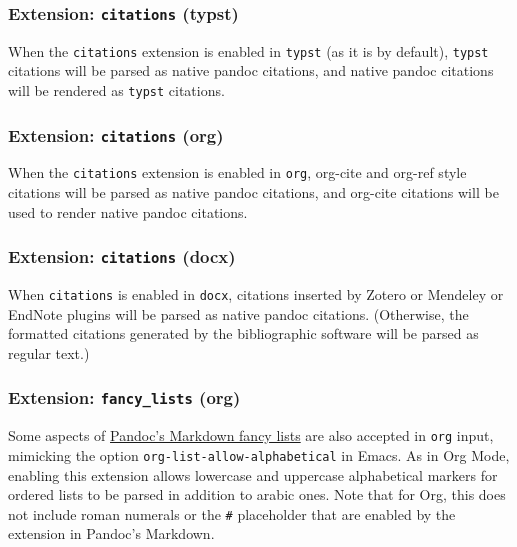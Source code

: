 \documentclass[
]{article}
\begin{document}
\hypertarget{typst-citations}{%
\subsubsection{\texorpdfstring{Extension: \texttt{citations}
(typst)}{Extension: citations (typst)}}\label{typst-citations}}

When the \texttt{citations} extension is enabled in \texttt{typst} (as
it is by default), \texttt{typst} citations will be parsed as native
pandoc citations, and native pandoc citations will be rendered as
\texttt{typst} citations.

\hypertarget{org-citations}{%
\subsubsection{\texorpdfstring{Extension: \texttt{citations}
(org)}{Extension: citations (org)}}\label{org-citations}}

When the \texttt{citations} extension is enabled in \texttt{org},
org-cite and org-ref style citations will be parsed as native pandoc
citations, and org-cite citations will be used to render native pandoc
citations.

\hypertarget{docx-citations}{%
\subsubsection{\texorpdfstring{Extension: \texttt{citations}
(docx)}{Extension: citations (docx)}}\label{docx-citations}}

When \texttt{citations} is enabled in \texttt{docx}, citations inserted
by Zotero or Mendeley or EndNote plugins will be parsed as native pandoc
citations. (Otherwise, the formatted citations generated by the
bibliographic software will be parsed as regular text.)

\hypertarget{org-fancy-lists}{%
\subsubsection{\texorpdfstring{Extension: \texttt{fancy\_lists}
(org)}{Extension: fancy\_lists (org)}}\label{org-fancy-lists}}

Some aspects of \protect\hyperlink{extension-fancy_lists}{Pandoc's
Markdown fancy lists} are also accepted in \texttt{org} input, mimicking
the option \texttt{org-list-allow-alphabetical} in Emacs. As in Org
Mode, enabling this extension allows lowercase and uppercase
alphabetical markers for ordered lists to be parsed in addition to
arabic ones. Note that for Org, this does not include roman numerals or
the \texttt{\#} placeholder that are enabled by the extension in
Pandoc's Markdown.
\end{document}
